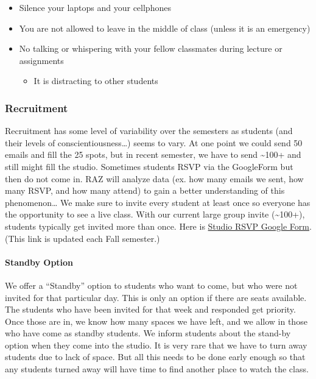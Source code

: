 \documentclass[
]{article}
\providecommand{\tightlist}{%
  \setlength{\itemsep}{0pt}\setlength{\parskip}{0pt}}
\begin{document}
\begin{itemize}
\begin{itemize}
    \begin{itemize}
    \tightlist
    \item
      Silence your laptops and your cellphones
    \item
      You are not allowed to leave in the middle of class (unless it is an emergency)
    \item
      No talking or whispering with your fellow classmates during lecture or assignments

      \begin{itemize}
      \tightlist
      \item
        It is distracting to other students
      \end{itemize}
    \end{itemize}
  \end{itemize}
\end{itemize}

\hypertarget{recruitment}{%
\subsubsection{Recruitment}\label{recruitment}}

Recruitment has some level of variability over the semesters as students (and their levels of conscientiousness\ldots) seems to vary. At one point we could send 50 emails and fill the 25 spots, but in recent semester, we have to send \textasciitilde100+ and still might fill the studio. Sometimes students RSVP via the GoogleForm but then do not come in. RAZ will analyze data (ex. how many emails we sent, how many RSVP, and how many attend) to gain a better understanding of this phenomenon\ldots{} We make sure to invite every student at least once so everyone has the opportunity to see a live class. With our current large group invite (\textasciitilde100+), students typically get invited more than once. Here is \href{https://docs.google.com/forms/d/e/1FAIpQLSf78IM5OYt4hCd3_si7c0RAzMm8IVTHrM-3eibe-eiXvmFmGQ/viewform}{Studio RSVP Google Form}. (This link is updated each Fall semester.)

\hypertarget{standby-option}{%
\paragraph{Standby Option}\label{standby-option}}

We offer a ``Standby'' option to students who want to come, but who were not invited for that particular day. This is only an option if there are seats available. The students who have been invited for that week and responded get priority. Once those are in, we know how many spaces we have left, and we allow in those who have come as standby students. We inform students about the stand-by option when they come into the studio. It is very rare that we have to turn away students due to lack of space. But all this needs to be done early enough so that any students turned away will have time to find another place to watch the class.
\end{document}
